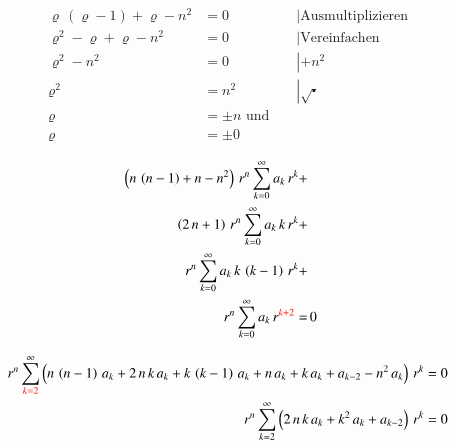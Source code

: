 \begin{refsection}
\begin{align*}
	\varrho \, \left( \varrho -1 \right) + \varrho - n^2 &= 0 && \left| \text{Ausmultiplizieren} \right. \\
	\varrho ^2 - \varrho + \varrho -n^2 &= 0 && \left| \text{Vereinfachen} \right.\\
	\varrho ^2 - n^2 &= 0 && \left| +n^2 \right.\\
	\varrho ^2 &= n^2 && \left| \sqrt{\centerdot} \right. \\
	\varrho &= \pm n \text{ und } \\
	\varrho &= \pm 0 %
\end{align*}


\begin{align*}
	\left(
	n \, \left( n - 1 \right)
	+
	n
	-
	n^2
	\right)
	\, r^{n}
	\sum_{k=0}^{\infty} a_k \, r^k
	+ \\
	\left(	
	2 \, n
	+
	1
	\right)
	\, r^{n}
	\sum_{k=0}^{\infty} a_k \, k \, r^k
	+ \\
	r^{n}
	\sum_{k=0}^{\infty} a_k \, k \, \left( k - 1 \right) \, r^k
	+ \\
	r^{n}
	\sum_{k=0}^{\infty} a_k \, r^{\textcolor{red}{k + 2}}
	= & \, 0
\end{align*}


\begin{align*}
	r^n
	\sum_{\textcolor{red}{k=2}}^{\infty}
	\left( n \, \left( n - 1 \right) \, a_k
	+
	2 \, n \, k \, a_k
	+
	k \, \left( k - 1 \right) \, a_k
	+
	n \, a_k
	+
	k \, a_k
	+
	a_{k-2}
	-
	n^2 \, a_k
	\right)
	\, r^k
	= 0 \\
	r^n
	\sum_{k=2}^{\infty}
	\left(
	2 \, n \, k \, a_k
	+
	k^2 \, a_k
	+
	a_{k - 2}
	\right)
	\, r^k
	= 0
\end{align*}



\end{refsection}
